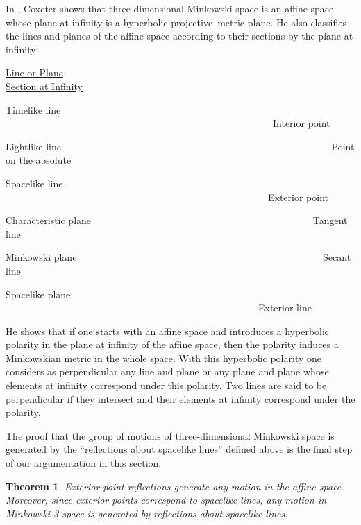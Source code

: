 \documentclass[a4paper,twoside,12pt]{article}
\newtheorem{theorem}{Theorem}[section]
\def\nind{\noindent}
\begin{document}
      In \cite{Cox1}, Coxeter
shows that three-dimensional Minkowski space is an affine space whose plane
at infinity is a hyperbolic projective--metric plane. He also classifies the
lines and planes of the affine space according to their sections by the
plane at infinity:

\medskip

\underline{Line or Plane}\ \ \ \ \ \ \ \ \ \ \ \ \ \ \ \ \ \ \ \ \ \ \ \ \ \
\ \ \ \ \ \ \ \ \ \ \ \ \ \ \ \ \ \ \ \ \ \ \ \ \ \ \ \ \ \ \underline{%
Section at Infinity}

Timelike line \ \ \ \ \ \ \ \ \ \ \ \ \ \ \ \ \ \ \ \ \ \ \ \ \ \ \ \ \ \ \
\ \ \ \ \ \ \ \ \ \ \ \ \ \ \ \ \ \ \ \ \ \ \ \ Interior point

Lightlike line \ \ \ \ \ \ \ \ \ \ \ \ \ \ \ \ \ \ \ \ \ \ \ \ \ \ \ \ \ \ \
\ \ \ \ \ \ \ \ \ \ \ \ \ \ \ \ \ \ \ \ \ \ \ \ Point on the absolute

Spacelike line \ \ \ \ \ \ \ \ \ \ \ \ \ \ \ \ \ \ \ \ \ \ \ \ \ \ \ \ \ \ \
\ \ \ \ \ \ \ \ \ \ \ \ \ \ \ \ \ \ \ \ \ \ \ Exterior point

Characteristic plane \ \ \ \ \ \ \ \ \ \ \ \ \ \ \ \ \ \ \ \ \ \ \ \ \ \ \ \
\ \ \ \ \ \ \ \ \ \ \ \ \ \ \ \ \ Tangent line

Minkowski plane \ \ \ \ \ \ \ \ \ \ \ \ \ \ \ \ \ \ \ \ \ \ \ \ \ \ \ \ \ \
\ \ \ \ \ \ \ \ \ \ \ \ \ \ \ \ \ \ \ \ Secant line

Spacelike plane \ \ \ \ \ \ \ \ \ \ \ \ \ \ \ \ \ \ \ \ \ \ \ \ \ \ \ \ \ \
\ \ \ \ \ \ \ \ \ \ \ \ \ \ \ \ \ \ \ \ \ \ Exterior line

\medskip

\nind He shows that if one starts with an affine space and introduces a
hyperbolic polarity in the plane at infinity of the affine space, then the
polarity induces a Minkowskian metric in the whole space. With this
hyperbolic polarity one considers as perpendicular any line and plane or any
plane and plane whose elements at infinity correspond under this polarity.
Two lines are said to be perpendicular if they intersect and their elements
at infinity correspond under the polarity.

     The proof that the group of motions of three-dimensional Minkowski
space is generated by the ``reflections about spacelike lines'' defined
above is the final step of our argumentation in this section. 

\begin{theorem} \label{main}
Exterior point reflections generate any motion in the affine space. 
Moreover, since exterior points correspond to spacelike lines,
any motion in Minkowski 3-space is generated by reflections about
spacelike lines.
\end{theorem}
\end{document}

